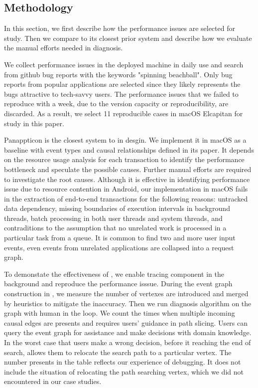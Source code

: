 \subsection{Methodology} \label{sec:methodology}

In this section, we first describe how the performance issues are selected for
study. Then we compare \xxx to its closest prior system and describe how we
evaluate the manual efforts needed in diagnosis.

We collect performance issues in the deployed machine in daily use and search
from github bug reports with the keywords "spinning beachball". Only bug
reports from popular applications are selected since they likely represents
the bugs attractive to tech-savvy users. The performance issues that we failed
to reproduce with a week, due to the version capacity or reproducibility, are
discarded. As a result, we select 11 reproducible cases in macOS Elcapitan for
study in this paper.


Panappticon is the closest system to \xxx in desgin. We implement it in macOS
as a baseline with event types and causal relationships defined in its paper.
It depends on the resource usage analysis for each transaction to identify
the performance bottleneck and speculate the possible causes. Further manual
efforts are required to investigate the root causes. Although it is effective
in identifying performance issue due to resource contention in Android, our
implementation in macOS fails in the extraction of end-to-end transactions
for the following reasons: untracked data dependency, missing boundaries of
execution intervals in background threads, batch processing in both user threads
and system threads, and contraditions to the assumption that no unrelated work
is processed in a particular task from a queue. It is common to find two and
more user input events, even events from unrelated applications are collapsed
into a request graph.

To demonstate the effectiveness of \xxx, we enable \xxx tracing component in
the background and reproduce the performance isssue. During the event graph
construction in \xxx, we measure the number of vertexes are introduced and
merged by heuristics to mitigate the inaccuracy. Then we run \xxx diagnosis
algorithm on the graph with human in the loop. We count the times when multiple
incoming causal edges are presents and \xxx requires users' guidance in path
slicing. Users can query the event graph for assistance and make decisions with
domain knowledge. In the worst case that users make a wrong decision, before it
reaching the end of search, \xxx allows them to relocate the search path to a
particular vertex. The number presents in the table reflects our experience of
debugging. It does not include the situation of relocating the path searching
vertex, which we did not encountered in our case studies.
